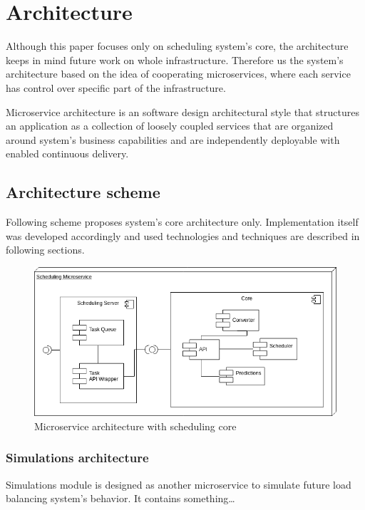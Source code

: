 \section{Architecture}\label{sec:architecture}

Although this paper focuses only on scheduling system's core,
the architecture keeps in mind future work on whole infrastructure.
Therefore us the system's architecture based on the idea of cooperating microservices,
where each service has control over specific part of the infrastructure. 

Microservice architecture is an software design architectural style 
that structures an application as a collection of loosely coupled services that 
are organized around system's business capabilities\cite{namiot2014micro} 
and are independently deployable with enabled continuous delivery\cite{balalaie2016microservices}.

\subsection{Architecture scheme}\label{subsec:architecture-scheme}
Following scheme proposes system's core architecture only. 
Implementation itself was developed accordingly 
and used technologies and techniques are described in following sections.

\begin{figure}[ht]
    \includegraphics[width=\textwidth]{i_scheduler.png} 
    \centering
    \caption{Microservice architecture with scheduling core}
    \label{fig:scheduling-core-arch}
\end{figure}



\subsubsection{Simulations architecture}\label{subsec:simulations-architecture}
Simulations module is designed as another microservice to simulate future load balancing system's behavior.
It contains something\ldots

